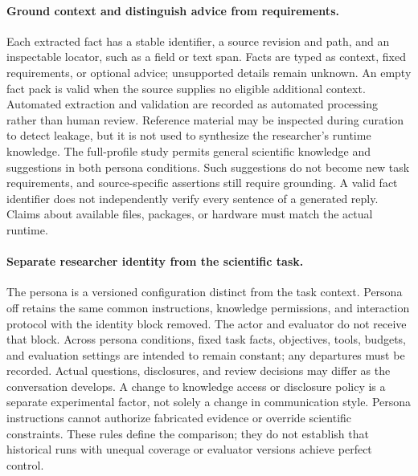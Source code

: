 \paragraph{Ground context and distinguish advice from requirements.}
Each extracted fact has a stable identifier, a source revision and path,
and an inspectable locator, such as a field or text span. Facts are typed
as context, fixed requirements, or optional advice; unsupported details
remain unknown. An empty fact pack is valid when the source supplies no
eligible additional context. Automated extraction and validation are
recorded as automated processing rather than human review. Reference
material may be inspected during curation to detect leakage, but it is not
used to synthesize the researcher's runtime knowledge. The full-profile
study permits general scientific knowledge and suggestions in both persona
conditions. Such suggestions do not become new task requirements, and
source-specific assertions still require grounding. A valid fact identifier
does not independently verify every sentence of a generated reply. Claims
about available files, packages, or hardware must match the actual runtime.

\paragraph{Separate researcher identity from the scientific task.}
The persona is a versioned configuration distinct from the task context.
Persona off retains the same common instructions, knowledge permissions,
and interaction protocol with the identity block removed. The actor and
evaluator do not receive that block. Across persona conditions, fixed task
facts, objectives, tools, budgets, and evaluation settings are intended to
remain constant; any departures must be recorded. Actual questions,
disclosures, and review decisions may differ as the conversation develops.
A change to knowledge access or disclosure policy is a separate experimental
factor, not solely a change in communication style. Persona instructions
cannot authorize fabricated evidence or override scientific constraints.
These rules define the comparison; they do not establish that historical
runs with unequal coverage or evaluator versions achieve perfect control.

